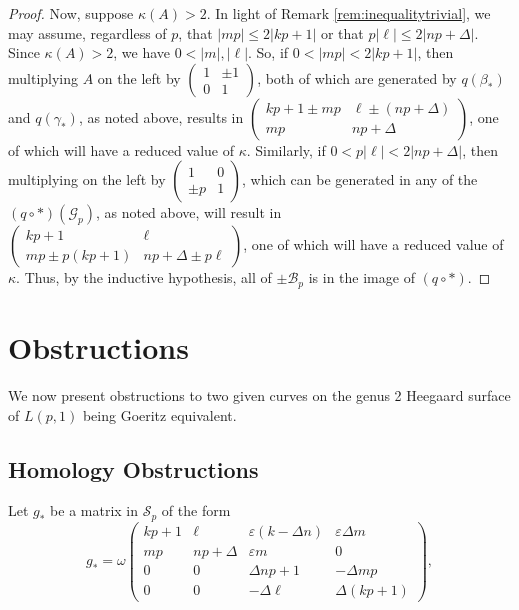 \documentclass{amsart}     %
\theoremstyle{definition}
\begin{document}
\begin{proof}
Now, suppose $\kappa(A) > 2$. In light of Remark \ref{rem:inequalitytrivial}, we may assume, regardless of $p$, that $|mp| \leq 2|kp+1|$ or that $p|\ell| \leq 2|np + \Delta|$. Since $\kappa(A) > 2$, we have $0 < |m|, |\ell|$. So, if $0 < |mp| < 2|kp+1|$, then multiplying $A$ on the left by $\begin{pmatrix} 1 & \pm1 \\ 0 & 1 \end{pmatrix}$, both of which are generated by $q(\beta_*)$ and $q(\gamma_*)$, as noted above, results in $\begin{pmatrix} kp+1\pm mp & \ell \pm (np + \Delta) \\ mp & np + \Delta \end{pmatrix}$, one of which will have a reduced value of $\kappa$. Similarly, if $0 < p|\ell| < 2|np + \Delta|$, then multiplying on the left by $\begin{pmatrix} 1 & 0 \\ \pm p & 1 \end{pmatrix}$, which can be generated in any of the $(q \circ *)(\mathcal{G}_p)$, as noted above, will result in $\begin{pmatrix} kp + 1 & \ell \\ mp \pm p(kp+1) & np + \Delta \pm p \ell \end{pmatrix}$, one of which will have a reduced value of $\kappa$. Thus, by the inductive hypothesis, all of $\pm \mathcal{B}_p$ is in the image of $(q \circ *)$.
\end{proof}




\section{Obstructions}
\label{section:Obstructions}
We now present obstructions to two given curves on the genus 2 Heegaard surface of $L(p, 1)$ being Goeritz equivalent.

\subsection{Homology Obstructions}
\label{subsection:HomologyObstructions}

Let $g_*$ be a matrix in $\mathcal S_p$ of the form \begin{equation} \tag{$g_*$} \label{eqn:gstar}  g_* = \omega \begin{pmatrix}  kp+1 & \ell & \varepsilon (k - \Delta n) & \varepsilon \Delta m \\
mp & np + \Delta & \varepsilon m & 0 \\ 0 & 0 & \Delta np + 1 & -\Delta  mp \\ 
0 & 0 & -\Delta \ell & \Delta(kp + 1) \end{pmatrix},\end{equation}
\end{document}
